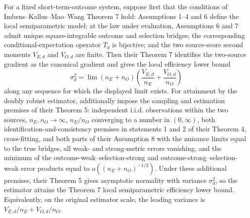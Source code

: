 For a fixed short-term-outcome system, suppose first that the conditions of Imbens--Kallus--Mao--Wang Theorem 7 hold: Assumptions 1--4 and 6 define the local semiparametric model; at the law under evaluation, Assumptions 6 and 7 admit unique square-integrable outcome and selection bridges; the corresponding conditional-expectation operator \(T_d\) is bijective; and the two source-score second moments \(V_{E,d}\) and \(V_{O,d}\) are finite. Then their Theorem 7 identifies the two-source gradient as the canonical gradient and gives the local efficiency lower bound
\[
 \sigma_d^2
 =\lim (n_E+n_O)\left(\frac{V_{E,d}}{n_E}+\frac{V_{O,d}}{n_O}\right)
\]
along any sequence for which the displayed limit exists. For attainment by the doubly robust estimator, additionally impose the sampling and estimation premises of their Theorem 5: independent i.i.d. observations within the two sources, \(n_E,n_O\to\infty\), \(n_E/n_O\) converging to a number in \((0,\infty)\), both identification-and-consistency premises in statements 1 and 2 of their Theorem 4, cross-fitting, and both parts of their Assumption 8 with the nuisance limits equal to the true bridges, all weak- and strong-metric errors vanishing, and the minimum of the outcome-weak--selection-strong and outcome-strong--selection-weak error products equal to \(o((n_E+n_O)^{-1/2})\). Under these additional premises, their Theorem 5 gives asymptotic normality with variance \(\sigma_d^2\), so the estimator attains the Theorem 7 local semiparametric efficiency lower bound. Equivalently, on the original estimator scale, the leading variance is \(V_{E,d}/n_E+V_{O,d}/n_O\).